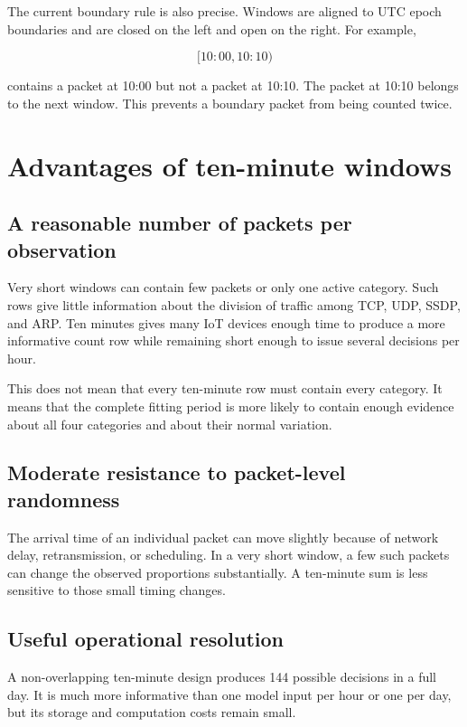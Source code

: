 \documentclass[11pt,a4paper]{article}
\begin{document}
The current boundary rule is also precise.  Windows are aligned to UTC epoch
boundaries and are closed on the left and open on the right.  For example,

\[
[10{:}00,10{:}10)
\]

contains a packet at 10:00 but not a packet at 10:10.  The packet at 10:10
belongs to the next window.  This prevents a boundary packet from being counted
twice.

\section{Advantages of ten-minute windows}

\subsection{A reasonable number of packets per observation}

Very short windows can contain few packets or only one active category.  Such
rows give little information about the division of traffic among TCP, UDP,
SSDP, and ARP.  Ten minutes gives many IoT devices enough time to produce a
more informative count row while remaining short enough to issue several
decisions per hour.

This does not mean that every ten-minute row must contain every category.  It
means that the complete fitting period is more likely to contain enough
evidence about all four categories and about their normal variation.

\subsection{Moderate resistance to packet-level randomness}

The arrival time of an individual packet can move slightly because of network
delay, retransmission, or scheduling.  In a very short window, a few such
packets can change the observed proportions substantially.  A ten-minute sum
is less sensitive to those small timing changes.

\subsection{Useful operational resolution}

A non-overlapping ten-minute design produces 144 possible decisions in a full
day.  It is much more informative than one model input per hour or one per day,
but its storage and computation costs remain small.
\end{document}
